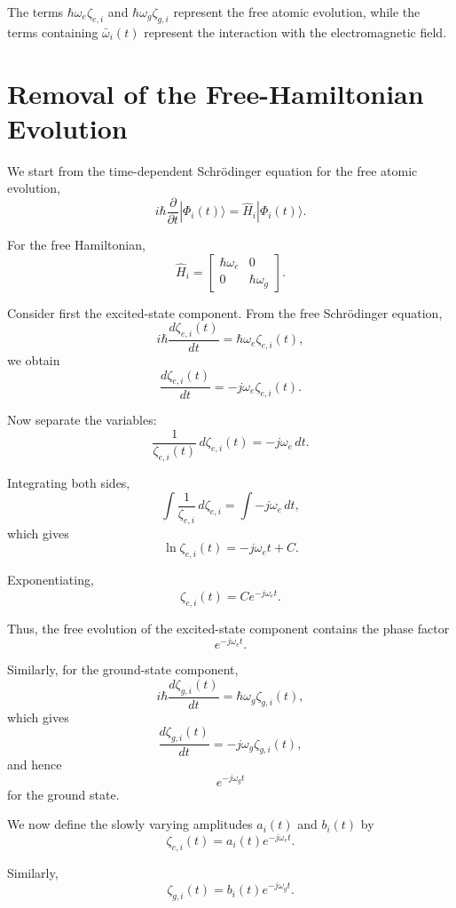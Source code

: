 \documentclass[12pt,a4paper]{article}
\begin{document}
The terms
\(\hbar\omega_e\zeta_{e,i}\)
and
\(\hbar\omega_g\zeta_{g,i}\)
represent the free atomic evolution, while the terms containing
\(\bar{\omega}_i(t)\) represent the interaction with the
electromagnetic field.

\section{Removal of the Free-Hamiltonian Evolution}

We start from the time-dependent Schr\"odinger equation for the
free atomic evolution,
\[
i\hbar
\frac{\partial}{\partial t}
|\Phi_i(t)\rangle
=
\hat H_i|\Phi_i(t)\rangle.
\]

For the free Hamiltonian,
\[
\hat H_i
=
\begin{bmatrix}
\hbar\omega_e & 0\\
0 & \hbar\omega_g
\end{bmatrix}.
\]

Consider first the excited-state component. From the free
Schr\"odinger equation,
\[
i\hbar
\frac{d\zeta_{e,i}(t)}{dt}
=
\hbar\omega_e\zeta_{e,i}(t),
\]
we obtain
\[
\frac{d\zeta_{e,i}(t)}{dt}
=
-j\omega_e\zeta_{e,i}(t).
\]

Now separate the variables:
\[
\frac{1}{\zeta_{e,i}(t)}
\,d\zeta_{e,i}(t)
=
-j\omega_e\,dt.
\]

Integrating both sides,
\[
\int
\frac{1}{\zeta_{e,i}}
\,d\zeta_{e,i}
=
\int
-j\omega_e\,dt,
\]
which gives
\[
\ln\zeta_{e,i}(t)
=
-j\omega_e t+C.
\]

Exponentiating,
\[
\zeta_{e,i}(t)
=
Ce^{-j\omega_e t}.
\]

Thus, the free evolution of the excited-state component contains
the phase factor
\[
\boxed{
e^{-j\omega_e t}
}.
\]

Similarly, for the ground-state component,
\[
i\hbar
\frac{d\zeta_{g,i}(t)}{dt}
=
\hbar\omega_g\zeta_{g,i}(t),
\]
which gives
\[
\frac{d\zeta_{g,i}(t)}{dt}
=
-j\omega_g\zeta_{g,i}(t),
\]
and hence
\[
\boxed{
e^{-j\omega_g t}
}
\]
for the ground state.

We now define the slowly varying amplitudes \(a_i(t)\) and
\(b_i(t)\) by
\begin{equation}
\boxed{
\zeta_{e,i}(t)
=
a_i(t)e^{-j\omega_e t}.
}
\tag{29a}
\end{equation}

Similarly,
\begin{equation}
\boxed{
\zeta_{g,i}(t)
=
b_i(t)e^{-j\omega_g t}.
}
\tag{29b}
\end{equation}
\end{document}
